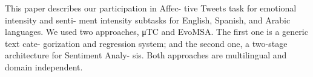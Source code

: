 This paper describes our participation in Affec- tive Tweets task for emotional intensity and senti- ment intensity subtasks for English, Spanish, and Arabic languages. We used two approaches, μTC and EvoMSA. The first one is a generic text cate- gorization and regression system; and the second one, a two-stage architecture for Sentiment Analy- sis. Both approaches are multilingual and domain independent.
